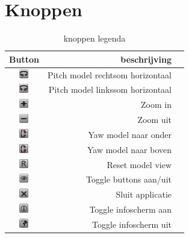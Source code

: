 \section{Knoppen} \label{sec:buttons}
\begin{table}[h]
  \centering
  \caption{knoppen legenda}
  \label{tb:table}
  \begin{tabular}{crl}
    \toprule
    Button     & beschrijving   \\
    \midrule
    \includegraphics[width=15px]{figs/button1.png}     & Pitch model rechtsom horizontaal   \\
    \includegraphics[width=15px]{figs/button2.png}     & Pitch model linkssom horizontaal   \\
    \includegraphics[width=15px]{figs/button3.png}     & Zoom in   \\
    \includegraphics[width=15px]{figs/button4.png}     & Zoom uit   \\
    \includegraphics[width=15px]{figs/button5.png}     & Yaw model naar onder   \\
    \includegraphics[width=15px]{figs/button6.png}     & Yaw model naar boven   \\
    \includegraphics[width=15px]{figs/button7.png}     & Reset model view   \\
    \includegraphics[width=15px]{figs/button8.png}     & Toggle buttons aan/uit   \\
    \includegraphics[width=15px]{figs/button9.png}     & Sluit applicatie   \\
    \includegraphics[width=15px]{figs/button10.png}    & Toggle infoscherm aan   \\
    \includegraphics[width=15px]{figs/button11.png}    & Toggle infoscherm uit   \\    
    \bottomrule
  \end{tabular}
\end{table}
